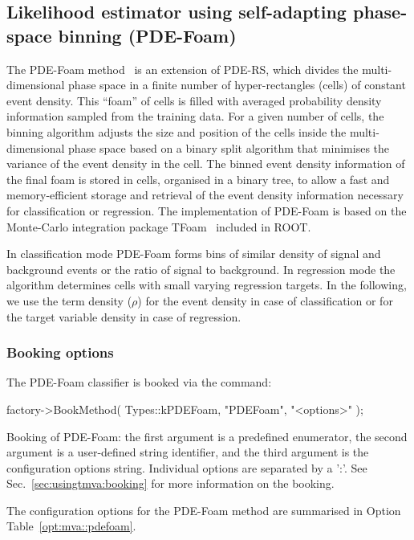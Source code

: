 \subsection{Likelihood estimator using self-adapting phase-space binning (PDE-Foam)}
\label{sec:pdefoam}

The PDE-Foam 
method~\cite{pdefoam} is an extension of PDE-RS, which
divides the multi-dimensional phase space in a finite number of
hyper-rectangles (cells) of constant event density.  This ``foam'' of
cells is filled with averaged probability density information sampled
from the training data.  For a given number of cells, the
binning algorithm adjusts the size and position of the cells inside
the multi-dimensional phase space based on a binary split algorithm that
minimises the variance of the event density in the cell.  The binned
event density information of the final foam is stored in cells,
organised in a binary tree, to allow a fast and memory-efficient
storage and retrieval of the event density information necessary for
classification or regression.  The implementation of PDE-Foam is based on the
Monte-Carlo integration package TFoam~\cite{tfoam} included in ROOT.

In classification mode PDE-Foam forms bins of similar density of signal 
and background events or the ratio of signal to background. In regression 
mode the algorithm determines cells with small varying regression targets. 
In the following, we use the term density ($\rho$) for the event density in
case of classification or for the target variable density in case of
regression.

\subsubsection{Booking options}

The PDE-Foam classifier is booked via the command:
\begin{codeexample}
\begin{tmvacode}
factory->BookMethod( Types::kPDEFoam, "PDEFoam", "<options>" );
\end{tmvacode}
\caption[.]{\codeexampleCaptionSize Booking of PDE-Foam: the first 
         argument is a predefined enumerator, the second argument is a
	 user-defined string identifier, and the third argument is the
	 configuration options string.  Individual options are
	 separated by a ':'.  See Sec.~\ref{sec:usingtmva:booking} for
	 more information on the booking.}
\end{codeexample}
%
The configuration options for the PDE-Foam method are summarised in 
Option Table~\ref{opt:mva::pdefoam}.

